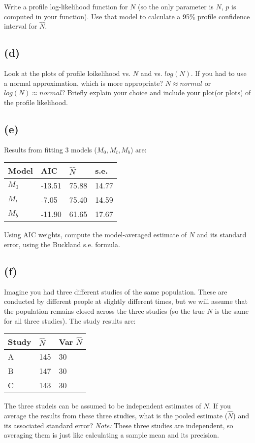 \documentclass[]{article}
\begin{document}
Write a profile log-likelihood function for \(N\) (so the only parameter
is \(N\), \(p\) is computed in your function). Use that model to
calculate a 95\% profile confidence interval for \(\hat{N}\).

\subsection{(d)}\label{d}

Look at the plots of profile loikelihood vs. \(N\) and vs. \(log(N)\).
If you had to use a normal approximation, which is more appropriate?
\(N \approx normal\) or \(log(N) \approx normal\)? Briefly explain your
choice and include your plot(or plots) of the profile likelihood.

\subsection{(e)}\label{e}

Results from fitting 3 models (\(M_0, M_t, M_b\)) are:

\begin{longtable}[]{@{}llll@{}}
\toprule
Model & AIC & \(\hat{N}\) & s.e.\tabularnewline
\midrule
\endhead
\(M_0\) & -13.51 & 75.88 & 14.77\tabularnewline
\(M_t\) & -7.05 & 75.40 & 14.59\tabularnewline
\(M_b\) & -11.90 & 61.65 & 17.67\tabularnewline
\bottomrule
\end{longtable}

Using AIC weights, compute the model-averaged estimate of \(N\) and its
standard error, using the Buckland s.e. formula.

\subsection{(f)}\label{f}

Imagine you had three different studies of the same population. These
are conducted by different people at slightly different times, but we
will assume that the population remains closed across the three studies
(so the true \(N\) is the same for all three studies). The study results
are:

\begin{longtable}[]{@{}lll@{}}
\toprule
Study & \(\hat{N}\) & Var \(\hat{N}\)\tabularnewline
\midrule
\endhead
A & 145 & 30\tabularnewline
B & 147 & 30\tabularnewline
C & 143 & 30\tabularnewline
\bottomrule
\end{longtable}

The three studeis can be assumed to be independent estimates of \(N\).
If you average the results from these three studies, what is the pooled
estimate (\(\hat{N}\)) and its associated standard error? \emph{Note:}
These three studies are independent, so averaging them is just like
calculating a sample mean and its precision.
\end{document}
